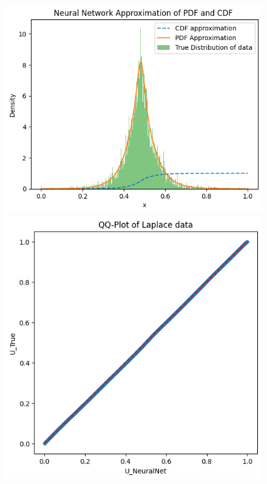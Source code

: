 \begin{figure}
\begin{minipage}{0.45\textwidth}
\begin{minipage}{0.48\textwidth}
        \end{minipage}
    \end{minipage}

    \vspace{1em}

    \begin{minipage}{0.45\textwidth}
        \centering
        \begin{minipage}{0.48\textwidth}
            \centering
            \includegraphics[width=\textwidth]{5ResultsDiscussion/pictures/MarginalTest/LaplaceHistogram.png}
        \end{minipage}
        \hfill
        \begin{minipage}{0.48\textwidth}
            \centering
            \includegraphics[width=\textwidth]{5ResultsDiscussion/pictures/MarginalTest/LaplaceQQ.png}

\end{minipage}
\end{minipage}
\end{figure}
